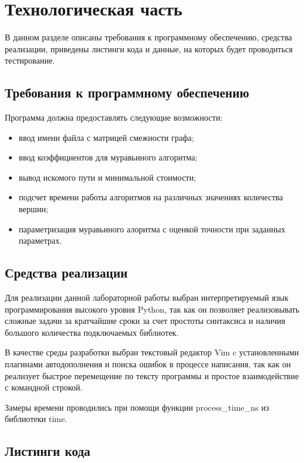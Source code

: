 \chapter{Технологическая часть}

В данном разделе описаны требования к программному обеспечению, средства
реализации, приведены листинги кода и данные, на которых будет проводиться
тестирование.

\section{Требования к программному обеспечению}

Программа должна предоставлять следующие возможности:
\begin{itemize}[left=\parindent]
    \item ввод имени файла с матрицей смежности графа;
    \item ввод коэффициентов для муравьиного алгоритма;
    \item вывод искомого пути и минимальной стоимости;
    \item подсчет времени работы алгоритмов на различных значениях количества
        вершин;
    \item параметризация муравьиного алоритма с оценкой точности при заданных
        параметрах.
\end{itemize}

\section{Средства реализации}

Для реализации данной лабораторной работы выбран интерпретируемый язык
программирования высокого уровня Python\cite{python}, так как он позволяет
реализовывать сложные задачи за кратчайшие сроки за счет простоты синтаксиса и
наличия большого количества подключаемых библиотек.

В качестве среды разработки выбран текстовый редактор Vim\cite{vim} c
установленными плагинами автодополнения и поиска ошибок в процессе написания,
так как он реализует быстрое перемещение по тексту программы и простое
взаимодействие с командной строкой.

Замеры времени проводились при помощи функции process\_time\_ns из библиотеки
time\cite{time}.

\newpage
\section{Листинги кода}

